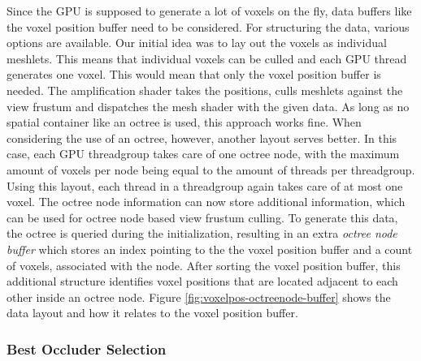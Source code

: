 \noindent
Since the \ac{GPU} is supposed to generate a lot of voxels on the fly, data buffers like the voxel position buffer 
need to be considered.
For structuring the data, various options are available. Our initial idea was to lay out the voxels as individual 
meshlets. This means that individual voxels can be culled and each \ac{GPU} thread generates one voxel. This would 
mean that only the voxel position buffer is needed. The amplification shader takes the positions, culls meshlets 
against the view frustum and dispatches the mesh shader with the given data. As long as no spatial container like 
an octree is used, this approach works fine. When considering the use of an octree, however, another layout serves 
better. In this case, each \ac{GPU} threadgroup takes care of one octree node, with the maximum amount of voxels 
per node being equal to the amount of threads per threadgroup. Using this layout, each thread in a threadgroup 
again takes care of at most one voxel. The octree node information can now store additional information, which can 
be used for octree node based view frustum culling. To generate this data, the octree is queried during the 
initialization, resulting in an extra \emph{octree node buffer} which stores an index pointing to the the voxel 
position buffer and a count of voxels, associated with the node. After sorting the voxel position buffer, this 
additional structure identifies voxel positions that are located adjacent to each other inside an octree node. Figure 
\ref{fig:voxelpos-octreenode-buffer} shows the data layout and how it relates to the voxel position buffer. 


\subsubsection*{Best Occluder Selection} \label{subsec-best-occluder-selection}

